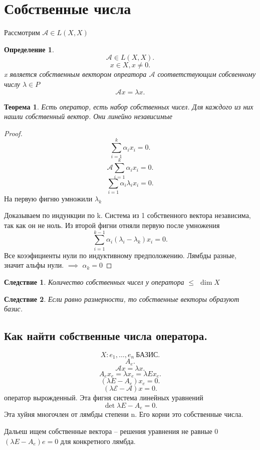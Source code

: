\documentclass{scrartcl}
\newtheorem{theorem}{Теорема}
\newtheorem{definition}{Определение}
\newtheorem{corollary}{Следствие}[theorem]
\begin{document}
\section{Собственные числа}
Рассмотрим $\mathcal{A} \in L(X,X)$
\begin{definition}
    \[
        \mathcal{A} \in L(X,X)
    .\] 
    \[
    x \in X , x\neq 0
    .\] 
    x является собственным вектором опреатора $\mathcal{A}$ соответствующим собсвенному числу  $\lambda \in P$
     \[
         \mathcal{A}x = \lambda x
    .\] 
\end{definition}
\begin{theorem}
    Есть оператор, есть набор собственных чисел. Для каждого из них нашли собственный вектор. Они линейно независимые
\end{theorem}
\begin{proof}
    \[
    \sum_{i = 1}^{k} \alpha_{i} x_{i} = 0
    .\] 
    \[
        \mathcal{A} \sum_{i =1}^{k} \alpha_{i} x_{i} = 0
    .\] 
    \[
    \sum_{i = 1}\alpha_{i} \lambda_{i} x_{i} = 0
    .\] 
    На первую фигню умножили $\lambda_{k}$

     Доказываем по индункции по k. Система из 1 собственного вектора независима, так как он не ноль.
     Из второй фигни отняли первую после умножения
     \[
     \sum_{i = 1}^{k-1} \alpha_i (\lambda_{i} - \lambda_{k}) x_i = 0
     .\] 
     Все коээфициенты нули по индуктивному предположению. Лямбды разные, значит альфы нули. $\implies$ $\alpha_{k} = 0$
\end{proof}
\begin{corollary}
    Количество собственных чисел у оператора $\le $ $\dim{X}$
\end{corollary}
\begin{corollary}
    Если равно размерности, то собственные векторы образуют базис.
\end{corollary}
\subsection{Как найти собственные числа оператора.}
\[
    X: e_1,\dots,e_{n} ~ \text{БАЗИС}
.\] 
\[
A_{e}
.\] 
\[
    \mathcal{A} x= \lambda x
.\] 
\[
A_{e} x_{e} = \lambda x_{e} = \lambda E x_{e}
.\] 
\[
    (\lambda E - A_{e}) x_{e} = 0
.\] 
\[
    (\lambda \mathcal{E} - \mathcal{A}) x = 0
.\] 
оператор вырожденный. Эта фигня система линейных уравнений
\[
    \det{\lambda E - A_{e}} = 0
.\] 
Эта хуйня многочлен от лямбды степени n. Его корни это собственные числа.

Дальеш ищем собственные вектора -- решения уравнения не равные 0 $(\lambda E - A_{e})e = 0$ 
для конкретного лямбда.
\end{document}
